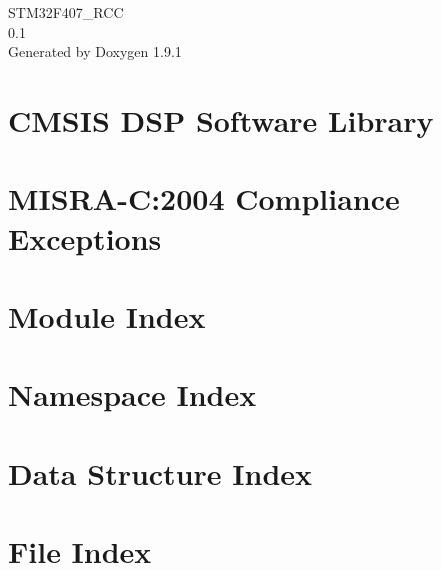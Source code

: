 \let\mypdfximage\pdfximage\def\pdfximage{\immediate\mypdfximage}\documentclass[twoside]{book}
\newcommand{\+}{\discretionary{\mbox{\scriptsize$\hookleftarrow$}}{}{}}
\newcommand{\clearemptydoublepage}{%
  \newpage{\pagestyle{empty}\cleardoublepage}%
}
\begin{document}
\raggedbottom

\begin{titlepage}
\vspace*{7cm}
\begin{center}%
{\Large STM32\+F407\+\_\+\+RCC \\[1ex]\large 0.\+1 }\\
\vspace*{1cm}
{\large Generated by Doxygen 1.9.1}\\
\end{center}
\end{titlepage}
\clearemptydoublepage
{}
\tableofcontents
\clearemptydoublepage
{}

\chapter{CMSIS DSP Software Library}
\label{index}
\chapter{MISRA-\/C\+:2004 Compliance Exceptions}
\label{_c_m_s_i_s__m_i_s_r_a__exceptions}

\chapter{Module Index}

\chapter{Namespace Index}

\chapter{Data Structure Index}

\chapter{File Index}

\end{document}
